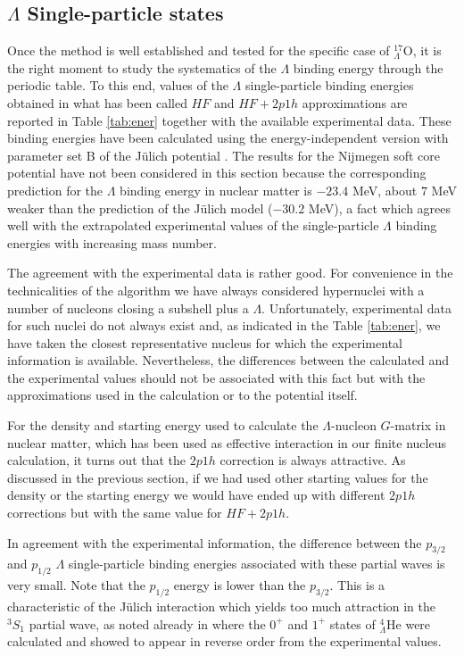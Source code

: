 \subsection{$\Lambda$ Single-particle states}
\label{results2}

Once the method is well established and tested for the specific case
of $_{\Lambda}^{17}$O, it is the right moment to study the systematics of the 
$\Lambda$ binding energy through the periodic table. 
To this end, values of the $\Lambda$ single-particle binding energies
 obtained in what has
been called $HF$ and $HF+2p1h$ approximations are reported in
Table \ref{tab:ener} together with the available experimental data.
These binding energies have been
calculated using the energy-independent version with parameter set B
of the J\"ulich potential \cite{juelich}. The results for the Nijmegen
soft core potential \cite{nijmegen} have
not been considered in this section because the corresponding prediction
for the
$\Lambda$ binding energy in nuclear matter is $-23.4$ MeV,
about $7$ MeV weaker than the prediction of the J\"ulich model
($-30.2$ MeV), a fact  which 
agrees well with the extrapolated experimental values
 of the
single-particle $\Lambda$ binding energies with increasing mass number.

The agreement with the experimental data is rather good.  
For convenience in the technicalities of the algorithm we have always
considered 
hypernuclei with a number of nucleons closing a subshell plus a $\Lambda$. 
Unfortunately, experimental data for such nuclei do not always exist and, 
as indicated in the Table \ref{tab:ener},
we have
taken the closest representative nucleus for which the experimental information is
available. Nevertheless, the differences between the calculated and the
experimental values should 
not be associated with 
this fact but with the approximations used in the calculation
or to the potential itself. 

 For the density and starting energy used to
calculate the $\Lambda$-nucleon $G$-matrix in nuclear matter, which
has been used as effective interaction in our finite nucleus
calculation, it turns out that the $2p1h$ correction is always
attractive. As
discussed in the previous section, if we had used other starting
values for the density or the starting energy  we would have ended up
with different $2p1h$ corrections but with the same value for
$HF+2p1h$.

In agreement with the experimental information, the difference between
 the $p_{3/2}$ and $p_{1/2}$ $\Lambda$ single-particle
 binding energies associated with these partial waves is very
small. Note that the $p_{1/2}$ energy is lower than the $p_{3/2}$. This is
a characteristic of the J\"ulich interaction which yields too much attraction
in the $^{3}S_{1}$ partial wave, 
as noted already in \cite{yama92,yama94} where the
$0^{+}$ and $1^{+}$ states of $_{\Lambda}^{4}$He were calculated and
showed to appear in reverse order from the experimental values.

